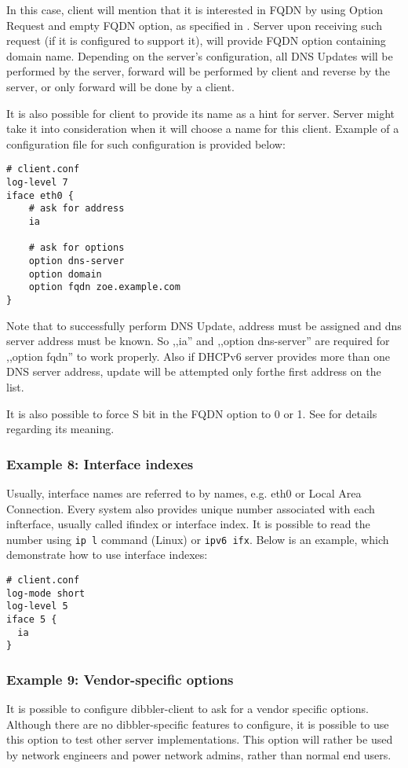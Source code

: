 In this case, client will mention that it is interested in FQDN by
using Option Request and empty FQDN option, as specified in
\cite{rfc4704}. Server upon receiving such request (if it is
configured to support it), will provide FQDN option containing domain
name. Depending on the server's configuration, all DNS Updates will be
performed by the server, forward will be performed by client and reverse
by the server, or only forward will be done by a client.

It is also possible for client to provide its name as a hint for
server. Server might take it into consideration when it will choose a
name for this client. Example of a configuration file for such
configuration is provided below:

\begin{lstlisting}
# client.conf
log-level 7
iface eth0 {
    # ask for address
    ia

    # ask for options
    option dns-server
    option domain
    option fqdn zoe.example.com
}
\end{lstlisting}

Note that to successfully perform DNS Update, address must be assigned
and dns server address must be known. So ,,ia'' and ,,option
dns-server'' are required for ,,option fqdn'' to work properly. Also if
DHCPv6 server provides more than one DNS server address, update will
be attempted only forthe first address on the list.

It is also possible to force S bit in the FQDN option to 0 or 1. See
\cite{rfc4704} for details regarding its meaning.

\subsubsection{Example 8: Interface indexes}
Usually, interface names are referred to by names, e.g. eth0 or Local
Area Connection. Every system also provides unique number associated
with each infterface, usually called ifindex or interface index. It is
possible to read the number using \verb+ip l+ command (Linux) or
\verb+ipv6 ifx+. Below is an example, which demonstrate how to use
interface indexes:

\begin{lstlisting}
# client.conf
log-mode short
log-level 5
iface 5 {
  ia
}
\end{lstlisting}

\subsubsection{Example 9: Vendor-specific options}
\label{example-client-vendor-spec}
It is possible to configure dibbler-client to ask for a vendor specific
options. Although there are no dibbler-specific features to configure,
it is possible to use this option to test other server
implementations. This option will rather be used by network engineers
and power network admins, rather than normal end users. 

